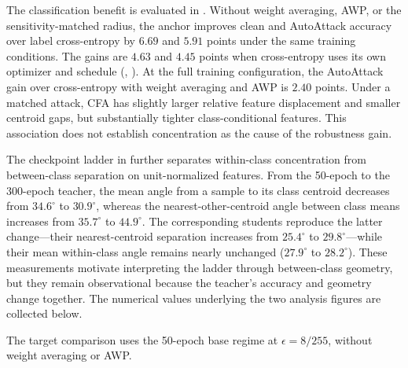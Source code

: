 The classification benefit is evaluated in . Without weight averaging, AWP,
or the sensitivity-matched radius, the anchor improves clean and AutoAttack accuracy over label
cross-entropy by $6.69$ and $5.91$ points under the same training conditions. The gains are $4.63$
and $4.45$ points when cross-entropy uses its own optimizer and schedule
(, ). At the full training configuration, the AutoAttack gain
over cross-entropy with weight averaging and AWP is $2.40$ points. Under a matched attack, CFA has
slightly larger relative feature displacement and smaller centroid gaps, but substantially tighter
class-conditional features. This association does not establish concentration as the cause of the
robustness gain.

The checkpoint ladder in  further separates within-class concentration from
between-class separation on unit-normalized features. From the 50-epoch to the 300-epoch teacher,
the mean angle from a sample to its class centroid decreases from $34.6^\circ$ to $30.9^\circ$,
whereas the nearest-other-centroid angle between class means increases from $35.7^\circ$ to $44.9^\circ$. The
corresponding students reproduce the latter change---their nearest-centroid separation increases from
$25.4^\circ$ to $29.8^\circ$---while their mean within-class angle remains nearly unchanged
($27.9^\circ$ to $28.2^\circ$). These measurements motivate interpreting the ladder through
between-class geometry, but they remain observational because the teacher's accuracy and geometry
change together. The numerical values underlying the two analysis figures are collected below.

The target comparison uses the 50-epoch base regime at $\epsilon=8/255$, without weight averaging
or AWP.

